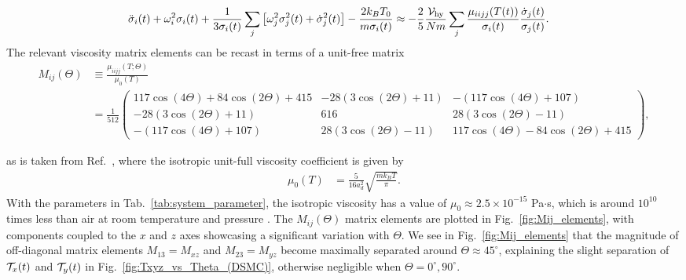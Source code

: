 \documentclass[reprint, amsmath, amssymb, aps, superscriptaddress]{revtex4-1}
\begin{document}
\begin{widetext}
\begin{align} \label{eq:widths_ODE_Tindependent}
    \ddot{\sigma}_i(t) 
    & +
    \omega_i^2 \sigma_i(t)
    +
    \frac{ 1 }{ 3 \sigma_i(t) }
    \sum_j
    \left[
    \omega_j^2 \sigma_j^2(t) 
    +
    \dot{\sigma}_j^2(t)
    \right]
    -
    \frac{ 2 k_B T_0 }{ m \sigma_i(t) } 
    \approx  
    - \frac{ 2 }{ 5 }
    \frac{ {\cal V}_{\rm hy} }{ N m } 
    \sum_{j} 
    \frac{ \mu_{i i j j}( T(t) ) }{ \sigma_i(t) }
    \frac{ \dot{\sigma}_{j}(t) }{ \sigma_{j}(t) }.
\end{align}
The relevant viscosity matrix elements can be recast in terms of a unit-free matrix
\begin{align} \label{eq:viscosity_matrix}
    M_{i j}(\Theta)
    &\equiv
    \frac{ \mu_{i i j j}(T; \Theta) }{ \mu_0(T) } \nonumber\\
    &= 
    \frac{ 1 }{ 512 }
    \begin{pmatrix}
         117 \cos(4\Theta) + 84 \cos(2\Theta) + 415  & 
        -28 ( 3 \cos(2\Theta) + 11 ) & 
        -( 117 \cos(4\Theta) + 107 ) \\[2.5pt]
        -28 ( 3 \cos(2\Theta) + 11 ) & 
        616 & 
        28 ( 3 \cos(2\Theta) - 11 ) \\[2.5pt]
        -( 117 \cos(4\Theta) + 107 ) & 
        28 ( 3 \cos(2\Theta) - 11 ) &
        117 \cos(4\Theta) - 84 \cos(2\Theta) + 415
    \end{pmatrix},
\end{align}
\end{widetext} 
as is taken from Ref.~\cite{Wang23_PRA}, where the isotropic unit-full viscosity coefficient is given by \cite{Chapman90_CUP} 
\begin{align} \label{eq:CE_viscosity_coefficient} 
    \mu_0(T)
    &=  
    \frac{ 5 }{ 16 a_d^2 } \sqrt{ \frac{ m k_B T }{ \pi } }.
\end{align}
With the parameters in Tab.~\ref{tab:system_parameter}, the isotropic viscosity has a value of $\mu_0 \approx 2.5 \times 10^{-15}$ Pa$\cdot$s, which is around $10^{10}$ times less than air at room temperature and pressure \cite{Kadoya85_JPCRD}.
The $M_{i j}(\Theta)$ matrix elements are plotted in Fig.~\ref{fig:Mij_elements}, with components coupled to the $x$ and $z$ axes showcasing a significant variation with $\Theta$. We see in Fig.~\ref{fig:Mij_elements} that the magnitude of off-diagonal matrix elements $M_{1 3} = M_{x z}$
and $M_{2 3} = M_{y z}$ become maximally separated around $\Theta \approx 45^{\circ}$, explaining the slight separation of ${\cal T}_x(t)$ and ${\cal T}_y(t)$ in Fig.~\ref{fig:Txyz_vs_Theta_(DSMC)}, otherwise negligible when $\Theta = 0^{\circ}, 90^{\circ}$.  
\end{document}

